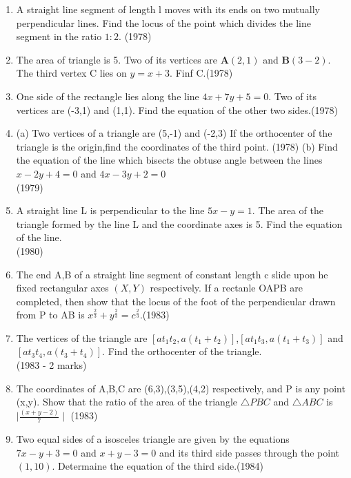 \documentclass[12pt]{article}
\let\vec\mathbf
\begin{document}
\begin{enumerate}
\begin{enumerate}

\item  A straight line segment of length l moves with its ends on two mutually perpendicular lines. Find the locus of the point which divides the line segment in the ratio $1:2$. (1978)
\item The area of triangle is 5. Two of its vertices are $\vec{A}(2,1)$ and $\vec{B}(3-2)$. The third vertex C lies on $y=x+3$. Finf C.(1978)
\item One side of the rectangle lies along the line $4x+7y+5=0$. Two of its vertices are (-3,1) and (1,1). Find the equation of the other two sides.(1978)
\item(a) Two vertices of a triangle are (5,-1) and (-2,3) If the orthocenter of the triangle is the origin,find the coordinates of the third point. (1978)
(b) Find the equation of the line which bisects the obtuse angle between the lines $x-2y+4=0$ and $4x-3y+2=0$\\ (1979)
\item  A straight line L is perpendicular to the line $5x-y=1$. The area of the triangle formed by the line L and the coordinate axes is 5. Find the equation of the line.\\ (1980)
\item The end A,B of a straight line segment of constant length c slide upon he fixed rectangular axes $(X,Y)$ respectively. If a rectanle OAPB are completed, then show that the locus of the foot of the perpendicular drawn from P to AB is $x^\frac{2}{3}+y^\frac{2}{3}=c^\frac{2}{3}$.(1983)
\item The vertices of the triangle are $[at_1t_2,a(t_1+t_2)]$,$[at_1t_3,a(t_1+t_3)]$ and $[at_3t_4,a(t_3+t_4)]$. Find the orthocenter of the triangle.\\ (1983 - 2 marks)
\item The coordinates of A,B,C are  (6,3),(3,5),(4,2) respectively, and P is any point (x,y). Show that the ratio of the area of the triangle $\triangle PBC$ and $\triangle ABC $ is $\mid\frac{(x+y-2)}{7}\mid$ (1983)
\item Two equal sides of a isosceles triangle are given by the equations $7x-y+3=0$ and $x+y-3=0$ and its third side passes through the point $(1,10)$. Determaine the equation of the third side.(1984)

\end{enumerate}
\end{enumerate}
\end{document}
